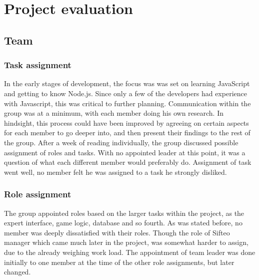 \chapter{Project evaluation}

\section{Team}

\subsection*{Task assignment}

In the early stages of development, the focus was was set on learning JavaScript and getting to know Node.js. Since only a few of the developers had experience with Javascript, this was critical to further planning. Communication within the group was at a minimum, with each member doing his own research. In hindsight, this process could have been improved by agreeing on certain aspects for each member to go deeper into, and then present their findings to the rest of the group. After a week of reading individually, the group discussed possible assignment of roles and tasks. With no appointed leader at this point, it was a question of what each different member would preferably do. Assignment of task went well, no member felt he was assigned to a task he strongly disliked.

\subsection*{Role assignment}

The group appointed roles based on the larger tasks within the project, as the expert interface, game logic, database and so fourth. As was stated before, no member was deeply dissatisfied with their roles. Though the role of Sifteo manager which came much later in the project, was somewhat harder to assign, due to the already weighing work load. The appointment of team leader was done initially to one member at the time of the other role assignments, but later changed. 


